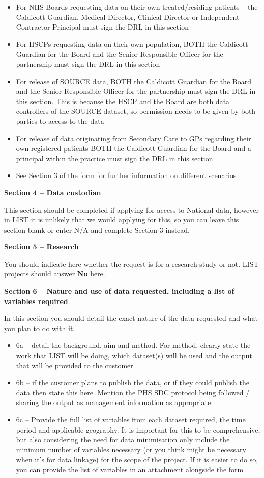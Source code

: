 \documentclass[
]{book}
\begin{document}
\begin{itemize}
\item
  For NHS Boards requesting data on their own treated/residing patients -- the Caldicott Guardian, Medical Director, Clinical Director or Independent Contractor Principal must sign the DRL in this section
\item
  For HSCPs requesting data on their own population, BOTH the Caldicott Guardian for the Board and the Senior Responsible Officer for the partnership must sign the DRL in this section
\item
  For release of SOURCE data, BOTH the Caldicott Guardian for the Board and the Senior Responsible Officer for the partnership must sign the DRL in this section. This is because the HSCP and the Board are both data controllers of the SOURCE dataset, so permission needs to be given by both parties to access to the data
\item
  For release of data originating from Secondary Care to GPs regarding their own registered patients BOTH the Caldicott Guardian for the Board and a principal within the practice must sign the DRL in this section
\item
  See Section 3 of the form for further information on different scenarios
\end{itemize}

\textbf{Section 4 -- Data custodian}

This section should be completed if applying for access to National data, however in LIST it is unlikely that we would applying for this, so you can leave this section blank or enter N/A and complete Section 3 instead.

\textbf{Section 5 -- Research}

You should indicate here whether the request is for a research study or not. LIST projects should answer \textbf{No} here.

\textbf{Section 6 -- Nature and use of data requested, including a list of variables required}

In this section you should detail the exact nature of the data requested and what you plan to do with it.

\begin{itemize}
\item
  6a -- detail the background, aim and method. For method, clearly state the work that LIST will be doing, which dataset(s) will be used and the output that will be provided to the customer
\item
  6b -- if the customer plans to publish the data, or if they could publish the data then state this here. Mention the PHS SDC protocol being followed / sharing the output as management information as appropriate
\item
  6c -- Provide the full list of variables from each dataset required, the time period and applicable geography. It is important for this to be comprehensive, but also considering the need for data minimisation only include the minimum number of variables necessary (or you think might be necessary when it's for data linkage) for the scope of the project. If it is easier to do so, you can provide the list of variables in an attachment alongside the form
\end{itemize}
\end{document}
